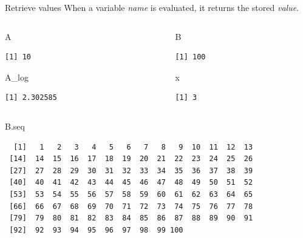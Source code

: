 \documentclass[
  ignorenonframetext,
]{beamer}
\newenvironment{Shaded}{\begin{snugshade}}{\end{snugshade}}
\newcommand{\NormalTok}[1]{#1}
\begin{document}
\begin{frame}[fragile]{Retrieve values}
\protect\hypertarget{retrieve-values}{}
When a variable \emph{name} is evaluated, it returns the stored
\emph{value}.

\begin{columns}[T,onlytextwidth]
\begin{column}{0.45\textwidth}
\begin{Shaded}
\begin{Highlighting}[]
\NormalTok{A}
\end{Highlighting}
\end{Shaded}

\begin{verbatim}
[1] 10
\end{verbatim}

\begin{Shaded}
\begin{Highlighting}[]
\NormalTok{A\_log}
\end{Highlighting}
\end{Shaded}

\begin{verbatim}
[1] 2.302585
\end{verbatim}
\end{column}

\begin{column}{0.45\textwidth}
\begin{Shaded}
\begin{Highlighting}[]
\NormalTok{B}
\end{Highlighting}
\end{Shaded}

\begin{verbatim}
[1] 100
\end{verbatim}

\begin{Shaded}
\begin{Highlighting}[]
\NormalTok{x}
\end{Highlighting}
\end{Shaded}

\begin{verbatim}
[1] 3
\end{verbatim}
\end{column}
\end{columns}

\begin{Shaded}
\begin{Highlighting}[]
\NormalTok{B.seq}
\end{Highlighting}
\end{Shaded}

\begin{verbatim}
  [1]   1   2   3   4   5   6   7   8   9  10  11  12  13
 [14]  14  15  16  17  18  19  20  21  22  23  24  25  26
 [27]  27  28  29  30  31  32  33  34  35  36  37  38  39
 [40]  40  41  42  43  44  45  46  47  48  49  50  51  52
 [53]  53  54  55  56  57  58  59  60  61  62  63  64  65
 [66]  66  67  68  69  70  71  72  73  74  75  76  77  78
 [79]  79  80  81  82  83  84  85  86  87  88  89  90  91
 [92]  92  93  94  95  96  97  98  99 100
\end{verbatim}
\end{frame}
\end{document}
